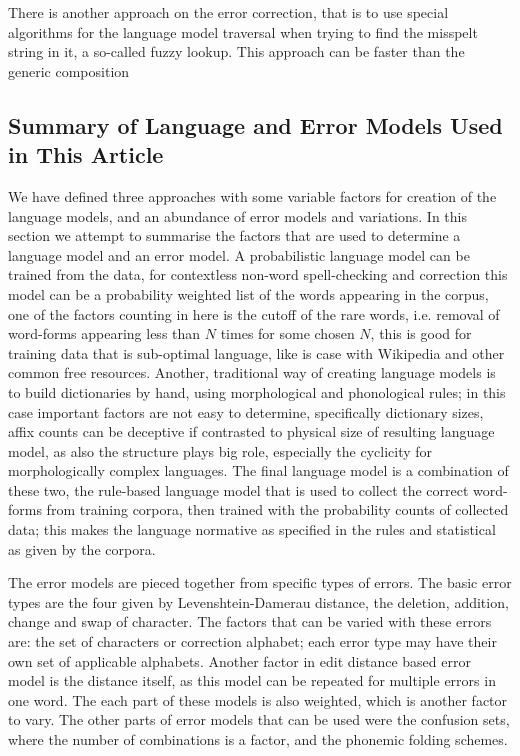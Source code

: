 \documentclass[a4paper,12pt]{article}
\begin{document}
There is another approach on the error correction, that is to use special
algorithms for the language model traversal when trying to find the misspelt
string in it, a so-called fuzzy lookup. This approach can be faster than
the generic composition

\subsection{Summary of Language and Error Models Used in This Article}

We have defined three approaches with some variable factors for creation of
the language models, and an abundance of error models and variations. In this
section we attempt to summarise the factors that are used to determine a
language model and an error model. A probabilistic language model can be
trained from the data, for contextless non-word spell-checking and correction
this model can be a probability weighted list of the words appearing in the
corpus, one of the factors counting in here is the cutoff of the rare words,
i.e. removal of word-forms appearing less than $N$ times for some chosen $N$,
this is good for training data that is sub-optimal language, like is case with
Wikipedia and other common free resources. Another, traditional way of creating
language models is to build dictionaries by hand, using morphological and
phonological rules; in this case important factors are not easy to determine,
specifically dictionary sizes, affix counts can be deceptive if contrasted to
physical size of resulting language model, as also the structure plays big
role, especially the cyclicity for morphologically complex languages. The
final language model is a combination of these two, the rule-based language
model that is used to collect the correct word-forms from training corpora,
then trained with the probability counts of collected data; this makes the
language normative as specified in the rules and statistical as given by
the corpora.

The error models are pieced together from specific types of errors. The
basic error types are the four given by Levenshtein-Damerau distance, the
deletion, addition, change and swap of character. The factors that can
be varied with these errors are: the set of characters or correction
alphabet; each error type may have their own set of applicable alphabets.
Another factor in edit distance based error model is the distance itself,
as this model can be repeated for multiple errors in one word. The each part
of these models is also weighted, which is another factor to vary. The other
parts of error models that can be used were the confusion sets, where the
number of combinations is a factor, and the phonemic folding schemes.
\end{document}
